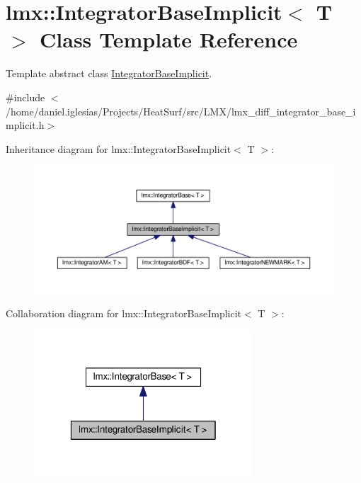 \hypertarget{classlmx_1_1IntegratorBaseImplicit}{\section{lmx\-:\-:Integrator\-Base\-Implicit$<$ T $>$ Class Template Reference}
\label{classlmx_1_1IntegratorBaseImplicit}
}


Template abstract class \hyperlink{classlmx_1_1IntegratorBaseImplicit}{Integrator\-Base\-Implicit}.  




{\ttfamily \#include $<$/home/daniel.\-iglesias/\-Projects/\-Heat\-Surf/src/\-L\-M\-X/lmx\-\_\-diff\-\_\-integrator\-\_\-base\-\_\-implicit.\-h$>$}



Inheritance diagram for lmx\-:\-:Integrator\-Base\-Implicit$<$ T $>$\-:
\nopagebreak
\begin{figure}[H]
\begin{center}
\leavevmode
\includegraphics[width=350pt]{classlmx_1_1IntegratorBaseImplicit__inherit__graph}
\end{center}
\end{figure}


Collaboration diagram for lmx\-:\-:Integrator\-Base\-Implicit$<$ T $>$\-:
\nopagebreak
\begin{figure}[H]
\begin{center}
\leavevmode
\includegraphics[width=232pt]{classlmx_1_1IntegratorBaseImplicit__coll__graph}
\end{center}
\end{figure}
